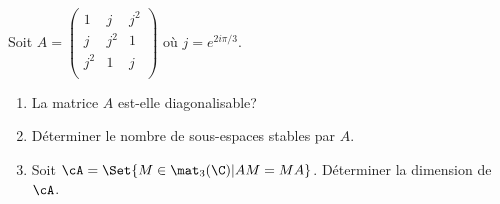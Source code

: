 \begin{enonce}
\begin{exercise}[ID={RMS130 E646},subtitle={Mines-Ponts PSI 2019},tags={}]
  Soit $A= \begin{pmatrix} 1&j&j^2\\ j&j^2&1\\ j^2&1&j\\ \end{pmatrix}$ où $j=e^{2i\pi / 3}$.
  \begin{enumerate}
    \item La matrice $A$ est-elle diagonalisable?
    \item Déterminer le nombre de sous-espaces stables par $A$.
    \item Soit $\cA = \Set{M\in\mat_3(\C) | AM=MA}$. Déterminer la dimension de $\cA$.
  \end{enumerate}
\end{exercise}
\begin{solution}
\end{solution}
\end{enonce}
